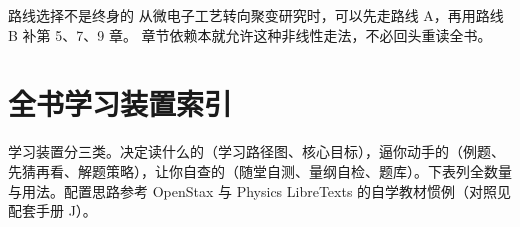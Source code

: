 \documentclass[12pt,a4paper,openany,oneside]{book}
\begin{document}
\begin{insight}{路线选择不是终身的}{}
从微电子工艺转向聚变研究时，可以先走路线 A，再用路线 B 补第 5、7、9 章。
章节依赖本就允许这种非线性走法，不必回头重读全书。
\end{insight}


\section*{全书学习装置索引}
{}

学习装置分三类。决定读什么的（学习路径图、核心目标），逼你动手的（例题、先猜再看、解题策略），让你自查的（随堂自测、量纲自检、题库）。下表列全数量与用法。配置思路参考 OpenStax 与 Physics LibreTexts 的自学教材惯例（对照见配套手册 J）。
\end{document}

